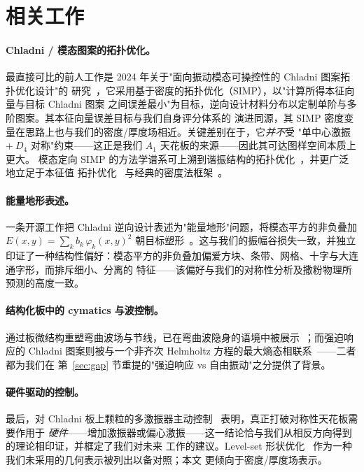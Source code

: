 \documentclass[11pt,a4paper]{article}
\newcommand{\Aone}{A_1}
\newcommand{\Dfour}{D_4}
\begin{document}
\section{相关工作}\label{sec:related}

\paragraph{Chladni / 模态图案的拓扑优化。}
最直接可比的前人工作是 2024 年关于"面向振动模态可操控性的 Chladni 图案拓扑优化设计"的
研究~\cite{acta2024}，它采用基于密度的拓扑优化（SIMP），以"计算所得本征向量与目标 Chladni 图案
之间误差最小"为目标，逆向设计材料分布以定制单阶与多阶图案。其本征向量误差目标与我们自身评分体系的
演进同源，其 SIMP 密度变量在思路上也与我们的密度/厚度场相近。关键差别在于，它\emph{并不}受
"单中心激振 $+\ \Dfour$ 对称"约束------这正是我们 $\Aone$ 天花板的来源------因此其可达图样空间本质上更大。
模态定向 SIMP 的方法学谱系可上溯到谐振结构的拓扑优化~\cite{tcherniak2002}，并更广泛地立足于本征值
拓扑优化~\cite{pedersen2000,achtziger2007} 与经典的密度法框架~\cite{bendsoe1989,bendsoe1999,bendsoe2003}。

\paragraph{能量地形表述。}
一条开源工作把 Chladni 逆向设计表述为"能量地形"问题，将模态平方的非负叠加
$E(x,y)=\sum_k b_k\,\varphi_k(x,y)^2$ 朝目标塑形~\cite{bellette}。这与我们的振幅谷损失一致，并独立
印证了一种结构性偏好：模态平方的非负叠加偏爱方块、条带、网格、十字与大连通字形，而排斥细小、分离的
特征------该偏好与我们的对称性分析及撒粉物理所预测的高度一致。

\paragraph{结构化板中的 cymatics 与波控制。}
通过板微结构重塑弯曲波场与节线，已在弯曲波隐身的语境中被展示~\cite{misseroni2016}；而强迫响应的
Chladni 图案则被与一个非齐次 Helmholtz 方程的最大熵态相联系~\cite{tuanchen}------二者都为我们在
第~\ref{sec:gap} 节重提的"强迫响应 vs 自由振动"之分提供了背景。

\paragraph{硬件驱动的控制。}
最后，对 Chladni 板上颗粒的多激振器主动控制~\cite{zhou2016} 表明，真正打破对称性天花板需要作用于
\emph{硬件}------增加激振器或偏心激振------这一结论恰与我们从相反方向得到的理论相印证，并框定了我们对未来
工作的建议。Level-set 形状优化~\cite{allaire2004} 作为一种我们未采用的几何表示被列出以备对照；本文
更倾向于密度/厚度场表示。
\end{document}
